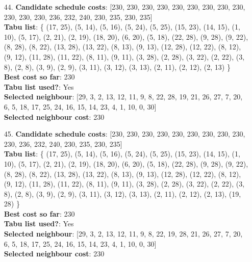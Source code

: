 \documentclass[fleqn]{article}
\begin{document}
\begin{itemize}
    \item[44.] \textbf{Candidate schedule costs}: [230, 230, 230, 230, 230, 230, 230, 230, 230, 230, 230, 230, 236, 232, 240, 230, 235, 230, 235] \\
    \textbf{Tabu list}: \{ (17, 25), (5, 14), (5, 16), (5, 24), (5, 25), (15, 23), (14, 15), (1, 10), (5, 17), (2, 21), (2, 19), (18, 20), (6, 20), (5, 18), (22, 28), (9, 28), (9, 22), (8, 28), (8, 22), (13, 28), (13, 22), (8, 13), (9, 13), (12, 28), (12, 22), (8, 12), (9, 12), (11, 28), (11, 22), (8, 11), (9, 11), (3, 28), (2, 28), (3, 22), (2, 22), (3, 8), (2, 8), (3, 9), (2, 9), (3, 11), (3, 12), (3, 13), (2, 11), (2, 12), (2, 13) \} \\
    \textbf{Best cost so far}: 230 \\
    \textbf{Tabu list used?}: Yes \\
    \textbf{Selected neighbour}: [29, 3, 2, 13, 12, 11, 9, 8, 22, 28, 19, 21, 26, 27, 7, 20, 6, 5, 18, 17, 25, 24, 16, 15, 14, 23, 4, 1, 10, 0, 30] \\
    \textbf{Selected neighbour cost}: 230
      

    \item[45.] \textbf{Candidate schedule costs}: [230, 230, 230, 230, 230, 230, 230, 230, 230, 230, 236, 232, 240, 230, 235, 230, 235] \\
    \textbf{Tabu list}: \{ (17, 25), (5, 14), (5, 16), (5, 24), (5, 25), (15, 23), (14, 15), (1, 10), (5, 17), (2, 21), (2, 19), (18, 20), (6, 20), (5, 18), (22, 28), (9, 28), (9, 22), (8, 28), (8, 22), (13, 28), (13, 22), (8, 13), (9, 13), (12, 28), (12, 22), (8, 12), (9, 12), (11, 28), (11, 22), (8, 11), (9, 11), (3, 28), (2, 28), (3, 22), (2, 22), (3, 8), (2, 8), (3, 9), (2, 9), (3, 11), (3, 12), (3, 13), (2, 11), (2, 12), (2, 13), (19, 28) \} \\
    \textbf{Best cost so far}: 230 \\
    \textbf{Tabu list used?}: Yes \\
    \textbf{Selected neighbour}: [29, 3, 2, 13, 12, 11, 9, 8, 22, 19, 28, 21, 26, 27, 7, 20, 6, 5, 18, 17, 25, 24, 16, 15, 14, 23, 4, 1, 10, 0, 30] \\
    \textbf{Selected neighbour cost}: 230
      


\end{itemize}
\end{document}
